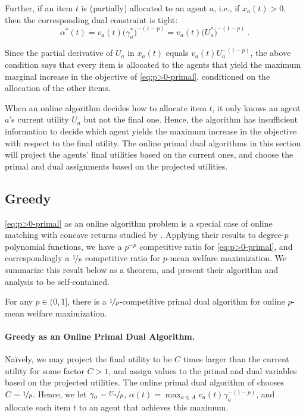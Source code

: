 \documentclass[11pt,letterpaper]{article}
\newcommand{\utility}{U}
\begin{document}
Further, if an item $t$ is (partially) allocated to an agent $a$, i.e., if $x_a(t) > 0$, then the corresponding dual constraint is tight:
\[
	\alpha^*(t) = v_a(t) \big(\gamma_a^*\big)^{-(1-p)} = v_a(t) \big(\utility_a^*\big)^{-(1-p)}
	~.
\]

Since the partial derivative of $U_a$ in $x_a(t)$ equals $v_a(t) U_a^{-(1-p)}$, the above condition says that every item is allocated to the agents that yield the maximum marginal increase in the objective of \ref{eq:p>0-primal}, conditioned on the allocation of the other items.	

When an online algorithm decides how to allocate item $t$, it only knows an agent $a$'s current utility $\utility_a$ but not the final one.
Hence, the algorithm has insufficient information to decide which agent yields the maximum increase in the objective with respect to the final utility.
The online primal dual algorithms in this section will project the agents' final utilities based on the current ones, and choose the primal and dual assignments based on the projected utilities.

\subsection{Greedy}

\ref{eq:p>0-primal} as an online algorithm problem is a special case of online matching with concave returns studied by \citet{DevanurJ:STOC:2012}.
Applying their results to degree-$p$ polynomial functions, we have a $p^{-p}$ competitive ratio for \ref{eq:p>0-primal}, and correspondingly a $\nicefrac{1}{p}$ competitive ratio for $p$-mean welfare maximization.
We summarize this result below as a theorem, and present their algorithm and analysis to be self-contained.
         
\begin{theorem}
	\label{thm:p>0-1/p}
	For any $p\in (0,1]$, there is a $\nicefrac{1}{p}$-competitive primal dual algorithm for online $p$-mean welfare maximization.
\end{theorem}





\paragraph{Greedy as an Online Primal Dual Algorithm.}
Na\"ively, we may project the final utility to be $C$ times larger than the current utility for some factor $C > 1$, and assign values to the primal and dual variables based on the projected utilities.
The online primal dual algorithm of \citet{DevanurJ:STOC:2012} chooses $C = \nicefrac{1}{p}$.
Hence, we let $\gamma_a = \nicefrac{\utility_a}{p}$, $\alpha(t) = \max_{a \in A} v_a(t) \gamma_a^{-(1-p)}$, and allocate each item $t$ to an agent that achieves this maximum.
\end{document}
